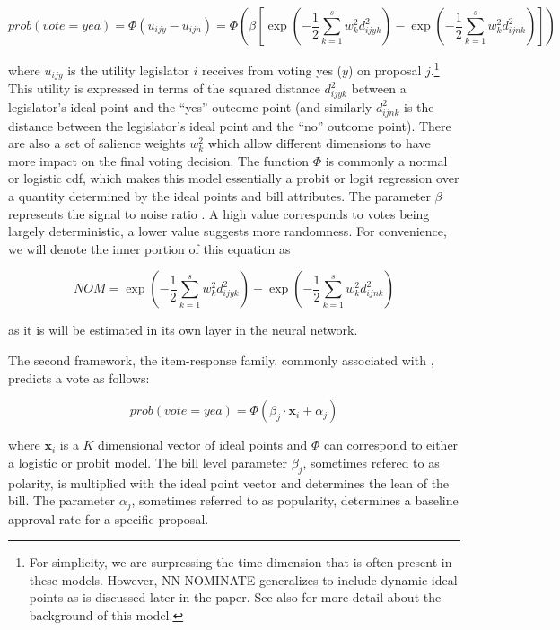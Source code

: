 \documentclass[11pt,]{article}
\begin{document}
\begin{equation}\label{eq:wnom}
prob(vote=yea) = \Phi\left(u_{ijy} - u_{ijn}\right) = \Phi\left(\beta \left[\exp\left(-\frac{1}{2}\sum_{k=1}^s w_k^2 d_{ijyk}^2 \right) - \exp\left({-\frac{1}{2}\sum_{k=1}^s w_k^2 d_{ijnk}^2 }\right)\right]\right)
\end{equation}

\noindent
where \(u_{ijy}\) is the utility legislator \(i\) receives from voting
yes (\(y\)) on proposal \(j\).\footnote{For simplicity, we are
  surpressing the time dimension that is often present in these models.
  However, NN-NOMINATE generalizes to include dynamic ideal points as is
  discussed later in the paper. See also \cite{carroll2009measuring} for
  more detail about the background of this model.} This utility is
expressed in terms of the squared distance \(d_{ijyk}^2\) between a
legislator's ideal point and the ``yes'' outcome point (and similarly
\(d_{ijnk}^2\) is the distance between the legislator's ideal point and
the ``no'' outcome point). There are also a set of salience weights
\(w_k^2\) which allow different dimensions to have more impact on the
final voting decision. The function \(\Phi\) is commonly a normal or
logistic cdf, which makes this model essentially a probit or logit
regression over a quantity determined by the ideal points and bill
attributes. The parameter \(\beta\) represents the signal to noise ratio
\citep{wnominate}. A high value corresponds to votes being largely
deterministic, a lower value suggests more randomness. For convenience,
we will denote the inner portion of this equation as

\begin{equation}\label{eq:jointwnom}
NOM = \exp\left(-\frac{1}{2}\sum_{k=1}^s w_k^2 d_{ijyk}^2 \right) - \exp\left({-\frac{1}{2}\sum_{k=1}^s w_k^2 d_{ijnk}^2 }\right)
\end{equation}

\noindent
as it is will be estimated in its own layer in the neural network.

The second framework, the item-response family, commonly associated with
\cite{clinton2004statistical}, predicts a vote as follows:

\begin{equation}\label{eq:irt}
prob(vote=yea) = \Phi\left(\beta_j \cdot \mathbf{x}_i + \alpha_j\right)
\end{equation}

\noindent
where \(\mathbf{x}_i\) is a \(K\) dimensional vector of ideal points and
\(\Phi\) can correspond to either a logistic or probit model. The bill
level parameter \(\beta_j\), sometimes refered to as polarity, is
multiplied with the ideal point vector and determines the lean of the
bill. The parameter \(\alpha_j\), sometimes referred to as popularity,
determines a baseline approval rate for a specific proposal.
\end{document}
